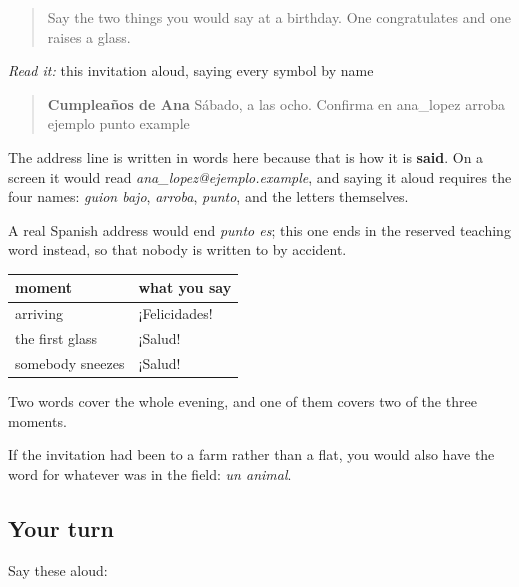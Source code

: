 \begin{quote}
Say the two things you would say at a birthday. One congratulates and one raises a glass.
\end{quote}

\begin{tcolorbox}[breakable,skin=enhanced,colback=orange!6,colframe=orange!45!black,boxrule=0.5pt,arc=1mm,left=6pt,right=6pt,top=4pt,bottom=4pt,fonttitle=\bfseries,title={Read this}]
\emph{Read it:} this invitation aloud, saying every symbol by name

\begin{quote}
\textbf{Cumpleaños de Ana} Sábado, a las ocho. Confirma en ana\_lopez arroba ejemplo punto example
\end{quote}

The address line is written in words here because that is how it is \textbf{said}. On a screen it would read \emph{ana\_lopez@ejemplo.example}, and saying it aloud requires the four names: \emph{guion bajo}, \emph{arroba}, \emph{punto}, and the letters themselves.

A real Spanish address would end \emph{punto es}; this one ends in the reserved teaching word instead, so that nobody is written to by accident.
\end{tcolorbox}

\begin{grammarlens}[title={Grammar Lens: answering it}]
\noindent
\begin{tabularx}{\linewidth}{@{}>{\raggedright\arraybackslash}X>{\raggedright\arraybackslash}X@{}}
\toprule
\textbf{moment} & \textbf{what you say} \\
\midrule
arriving & ¡Felicidades! \\
the first glass & ¡Salud! \\
somebody sneezes & ¡Salud! \\
\bottomrule
\end{tabularx}

Two words cover the whole evening, and one of them covers two of the three moments.

If the invitation had been to a farm rather than a flat, you would also have the word for whatever was in the field: \emph{un animal}.
\end{grammarlens}

\subsection*{Your turn}
Say these aloud:

